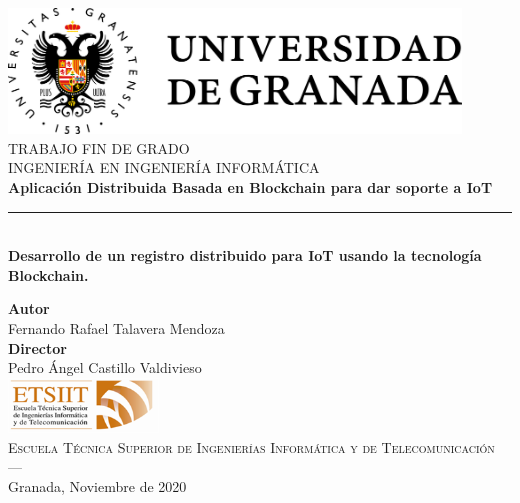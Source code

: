 \begin{titlepage}
 
\newlength{\centeroffset}
\setlength{\centeroffset}{-0.5\oddsidemargin}
\addtolength{\centeroffset}{0.5\evensidemargin}

\noindent\hspace*{\centeroffset}\begin{minipage}{\textwidth}

\centering
\includegraphics[width=0.9\textwidth]{imagenes/logo_ugr}\\[1.4cm]

\textsc{ \Large TRABAJO FIN DE GRADO\\[0.2cm]}
\textsc{ INGENIERÍA EN INGENIERÍA INFORMÁTICA}\\[1cm]
% 
{\LARGE\bfseries Aplicación Distribuida Basada en Blockchain para dar soporte a IoT\\
}
\noindent\rule[-1ex]{\textwidth}{3pt}\\[3.5ex]
{\large\bfseries Desarrollo de un registro distribuido para IoT usando la tecnología Blockchain.}
\end{minipage}

\vspace{2.5cm}
\noindent\hspace*{\centeroffset}\begin{minipage}{\textwidth}
\centering

\textbf{Autor}\\ {Fernando Rafael Talavera Mendoza}\\[2.5ex]
\textbf{Director}\\
{Pedro Ángel Castillo Valdivieso}\\[2cm]
\includegraphics[width=0.3\textwidth]{imagenes/etsiit_logo}\\[0.1cm]
\textsc{Escuela Técnica Superior de Ingenierías Informática y de Telecomunicación}\\
\textsc{---}\\
Granada, Noviembre de 2020
\end{minipage}
\end{titlepage}



